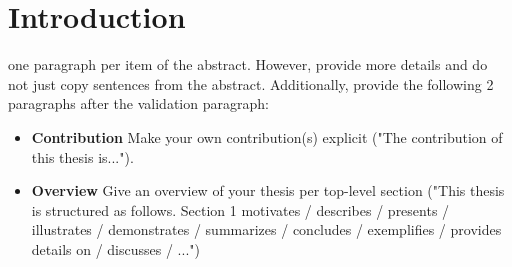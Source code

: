 
\chapter{Introduction}
one paragraph per item of the abstract. However, provide more details and do not just copy sentences from the abstract. Additionally, provide the following 2 paragraphs after the validation paragraph:
\begin{itemize}
	\item \textbf{Contribution} Make your own contribution(s) explicit ("The contribution of this thesis is...").
	\item  \textbf{Overview} Give an overview of your thesis per top-level section ("This thesis is structured as follows. Section 1 motivates / describes / presents / illustrates / demonstrates / summarizes / concludes / exemplifies / provides details on / discusses / ...")
\end{itemize}

